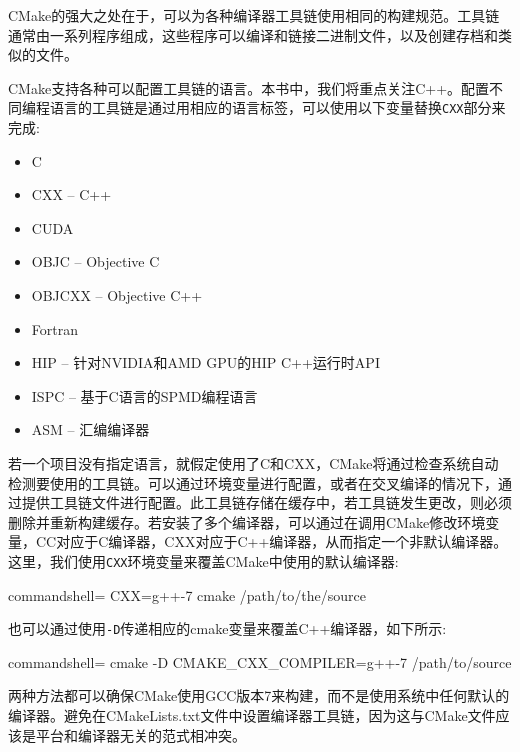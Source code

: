 CMake的强大之处在于，可以为各种编译器工具链使用相同的构建规范。工具链通常由一系列程序组成，这些程序可以编译和链接二进制文件，以及创建存档和类似的文件。

CMake支持各种可以配置工具链的语言。本书中，我们将重点关注C++。配置不同编程语言的工具链是通过用相应的语言标签，可以使用以下变量替换\texttt{CXX}部分来完成:

\begin{itemize}
\item 
C

\item 
CXX – C++

\item 
CUDA

\item 
OBJC – Objective C

\item 
OBJCXX – Objective C++

\item 
Fortran

\item 
HIP – 针对NVIDIA和AMD GPU的HIP C++运行时API

\item 
ISPC – 基于C语言的SPMD编程语言

\item 
ASM – 汇编编译器
\end{itemize}

若一个项目没有指定语言，就假定使用了C和CXX，CMake将通过检查系统自动检测要使用的工具链。可以通过环境变量进行配置，或者在交叉编译的情况下，通过提供工具链文件进行配置。此工具链存储在缓存中，若工具链发生更改，则必须删除并重新构建缓存。若安装了多个编译器，可以通过在调用CMake修改环境变量，CC对应于C编译器，CXX对应于C++编译器，从而指定一个非默认编译器。这里，我们使用\texttt{CXX}环境变量来覆盖CMake中使用的默认编译器:

\begin{tcblisting}{commandshell={}}
CXX=g++-7 cmake /path/to/the/source
\end{tcblisting}

也可以通过使用\texttt{-D}传递相应的cmake变量来覆盖C++编译器，如下所示:

\begin{tcblisting}{commandshell={}}
cmake -D CMAKE_CXX_COMPILER=g++-7 /path/to/source
\end{tcblisting}

两种方法都可以确保CMake使用GCC版本7来构建，而不是使用系统中任何默认的编译器。避免在CMakeLists.txt文件中设置编译器工具链，因为这与CMake文件应该是平台和编译器无关的范式相冲突。

